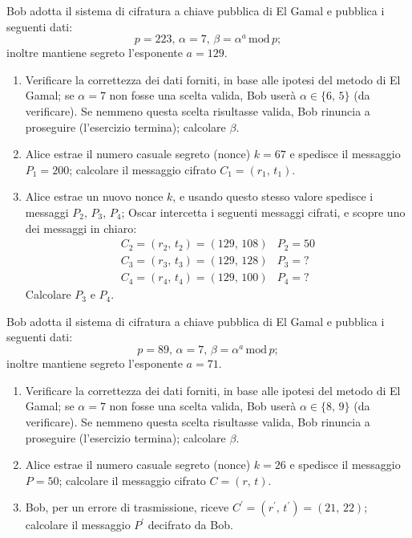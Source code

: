         Bob adotta il sistema di cifratura a chiave pubblica di El Gamal e pubblica i seguenti dati: \[
            p=223,\, \alpha=7,\, \beta= \alpha^{a} \,\mathrm{mod}\, p
        ;\] inoltre mantiene segreto l'esponente $a=129$.
        \begin{enumerate}
            \item Verificare la correttezza dei dati forniti, in base alle ipotesi del metodo di 
                El Gamal; se $\alpha=7$ non fosse una scelta valida, Bob userà $\alpha\in\{6,\,5\}$ 
                (da verificare). Se nemmeno questa scelta risultasse valida, Bob rinuncia a proseguire 
                (l'esercizio termina); calcolare $\beta$.
            \item Alice estrae il numero casuale segreto (nonce) $k=67$ e spedisce il messaggio $P_1=200$; 
                calcolare il messaggio cifrato $C_1=(r_1,\,t_1)$.
            \item Alice estrae un nuovo nonce $k$, e usando questo stesso valore spedisce i messaggi 
                $P_2,\,P_3,\,P_4$; Oscar intercetta i seguenti messaggi cifrati, e scopre uno dei messaggi 
                in chiaro: \[
                \begin{array}{ll}
                    C_2=(r_2,\,t_2)=(129,\,108) & P_2=50\\
                    C_3=(r_3,\,t_3)=(129,\,128) & P_3=?\\
                    C_4=(r_4,\,t_4)=(129,\,100) & P_4=?
                \end{array}
                \] Calcolare $P_3$ e $P_4$.
        \end{enumerate}

        Bob adotta il sistema di cifratura a chiave pubblica di El Gamal e pubblica i seguenti dati: \[
            p=89,\, \alpha=7,\, \beta= \alpha^{a} \,\mathrm{mod}\, p
        ;\] inoltre mantiene segreto l'esponente $a=71$.
        \begin{enumerate}
            \item Verificare la correttezza dei dati forniti, in base alle ipotesi del metodo di 
                El Gamal; se $\alpha=7$ non fosse una scelta valida, Bob userà $\alpha\in\{8,\,9\}$ 
                (da verificare). Se nemmeno questa scelta risultasse valida, Bob rinuncia a proseguire 
                (l'esercizio termina); calcolare $\beta$.
            \item Alice estrae il numero casuale segreto (nonce) $k=26$ e spedisce il messaggio $P=50$; 
                calcolare il messaggio cifrato $C=(r,\,t)$.
            \item Bob, per un errore di trasmissione, riceve $C^{\prime}=(r^{\prime},\,t^{\prime})=(21,\,22)$; 
                calcolare il messaggio $P^{\prime}$ decifrato da Bob.
        \end{enumerate}

